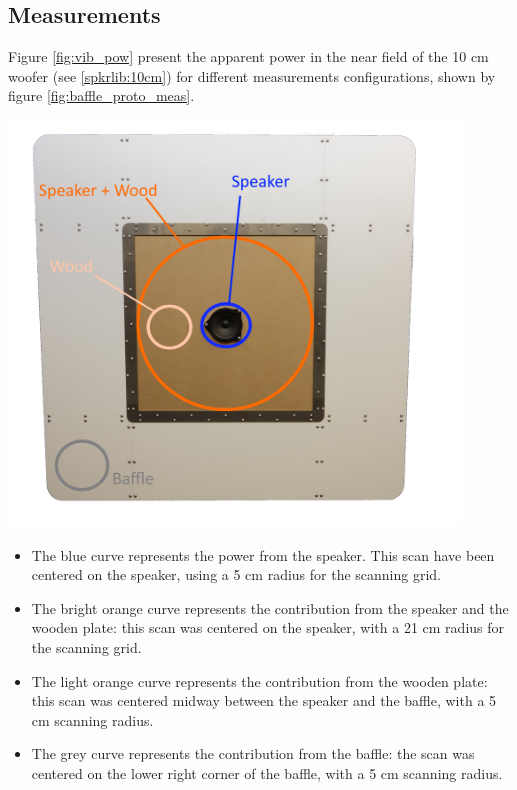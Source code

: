 \documentclass{report}
\begin{document}
\subsection{Measurements}

Figure \ref{fig:vib_pow} present the apparent power in the near field of the 10 cm woofer (see \ref{spkrlib:10cm}) for different measurements configurations, shown by figure \ref{fig:baffle_proto_meas}.

\vspace{0.5cm}

\begin{minipage}{0.3\textwidth}
\begin{center}
	\includegraphics[width=0.9\textwidth]{GridOpti/Baffle_meas_Points} 
    \captionsetup{hypcap=false} 
	\label{fig:baffle_proto_meas}
\end{center}
\end{minipage}
\begin{minipage}{0.7\textwidth}

\begin{itemize}
\item The blue curve represents the power from the speaker. This scan have been centered on the speaker, using a 5 cm radius for the scanning grid. 
\item The bright orange curve represents the contribution from the speaker and the wooden plate: this scan was centered on the speaker, with a 21 cm radius for the scanning grid.
\item The light orange curve represents the contribution from the wooden plate: this scan was centered midway between the speaker and the baffle, with a 5 cm scanning radius. 
\item  The grey curve represents the contribution from the baffle: the scan was centered on the lower right corner of the baffle, with a 5 cm scanning radius. 
\end{itemize}
\end{minipage}
\end{document}
